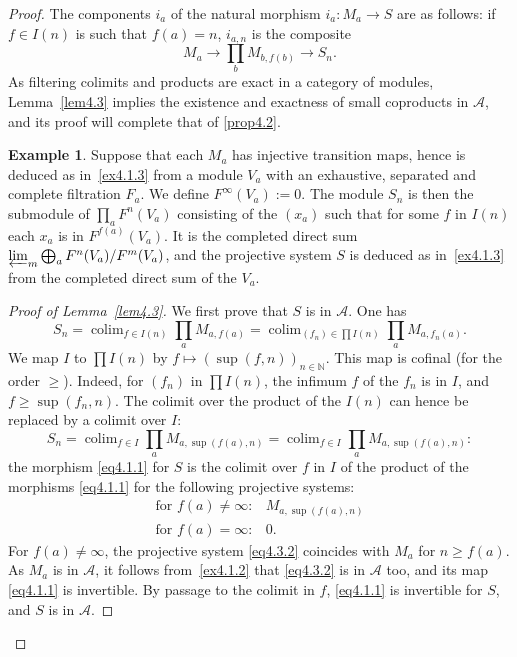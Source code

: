 \documentclass[11pt,a4paper]{article}
\theoremstyle{plain}
\theoremstyle{definition}
\newtheorem{example}[theorem]{Example}
\DeclareMathOperator{\colim}{colim}
\numberwithin{equation}{section}
\begin{document}
\begin{proof}
The components $i_{a}$ of the natural morphism $i_{a}: M_{a} \to S$ are as follows: if $f \in I(n)$ is such that $f(a) = n$, $i_{a,n}$ is the composite
\begin{equation*}
M_{a} \to \prod_{b} M_{b,f(b)} \to S_{n}.
\end{equation*}
As filtering colimits and products are exact in a category of modules, Lemma~\ref{lem4.3} implies the existence and exactness of small coproducts in $\mathcal{A}$, and its proof will complete that of \ref{prop4.2}.

\begin{example}\label{ex4.3.1}
Suppose that each $M_{a}$ has injective transition maps, hence is deduced as in~\ref{ex4.1.3} from a module $V_{a}$ with an exhaustive, separated and complete filtration $F_{a}$. We define $F^{\infty}(V_{a}) := 0$. The module $S_{n}$ is then the submodule of $\prod_{a} F^{n}(V_{a})$ consisting of the $(x_{a})$ such that for some $f$ in $I(n)$ each $x_{a}$ is in $F^{f(a)}(V_{a})$. It is the completed direct sum $\varprojlim_{m} \bigoplus_{a} F^{n}(V_{a})/F^{m}(V_{a})$, and the projective system $S$ is deduced as in~\ref{ex4.1.3} from the completed direct sum of the $V_{a}$.
\end{example}

\begin{proof}[Proof of Lemma~\ref{lem4.3}]
We first prove that $S$ is in $\mathcal{A}$. One has
\begin{equation*}
S_{n} = \colim_{f\in I(n)} \prod_{a} M_{a,f(a)} = \colim_{(f_{n})\in\prod I(n)} \prod_{a} M_{a,f_{n}(a)}.
\end{equation*}
We map $I$ to $\prod I(n)$ by $f \mapsto (\sup(f,n))_{n\in\mathbb{N}}$. This map is cofinal (for the order $\geq$). Indeed, for $(f_{n})$ in $\prod I(n)$, the infimum $f$ of the $f_{n}$ is in $I$, and $f \geq \sup(f_{n},n)$. The colimit over the product of the $I(n)$ can hence be replaced by a colimit over $I$:
\begin{equation*}
S_{n} = \colim_{f\in I} \prod_{a} M_{a,\sup(f(a),n)} = \colim_{f\in I} \prod_{a} M_{a,\sup(f(a),n)}:
\end{equation*}
the morphism \eqref{eq4.1.1} for $S$ is the colimit over $f$ in $I$ of the product of the morphisms \eqref{eq4.1.1} for the following projective systems:
\begin{equation}
\begin{array}{ll}
\text{for } f(a) \neq \infty: & M_{a,\sup(f(a),n)} \\[4pt]
\text{for } f(a) = \infty: & 0.
\end{array}
\tag{4.3.2}
\end{equation}
For $f(a) \neq \infty$, the projective system \eqref{eq4.3.2} coincides with $M_{a}$ for $n \geq f(a)$. As $M_{a}$ is in $\mathcal{A}$, it follows from~\ref{ex4.1.2} that \eqref{eq4.3.2} is in $\mathcal{A}$ too, and its map \eqref{eq4.1.1} is invertible. By passage to the colimit in $f$, \eqref{eq4.1.1} is invertible for $S$, and $S$ is in $\mathcal{A}$.


\end{proof}
\end{proof}
\end{document}
